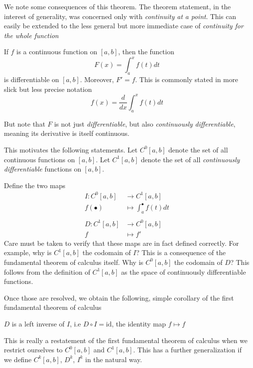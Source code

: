 \documentclass{article}
\begin{document}
We note some consequences of this theorem. The theorem statement, in the interest of generality, was concerned only with \emph{continuity at a point}. This can easily be extended to the less general but more immediate case of \emph{continuity for the whole function}

\begin{corollary}
    If $f$ is a continuous function on $[a, b]$, then the function
    \[
        F(x) = \int_a^x f(t)dt
    \]
    is differentiable on $[a, b]$. Moreover, $F' = f$. This is commonly stated in more slick but less precise notation
    \[
        f(x) = \frac{d}{dx}\int_a^x f(t)dt
    \]
\end{corollary}

But note that $F$ is not just \emph{differentiable}, but also \emph{continuously differentiable}, meaning its derivative is itself continuous.

This motivates the following statements. Let $C^0[a,b]$ denote the set of all continuous functions on $[a, b]$. Let $C^1[a,b]$ denote the set of all \emph{continuously differentiable} functions on $[a, b]$.

Define the two maps
\begin{align*}
    I: C^0[a,b] &\to C^1[a,b] \\
                f(\bullet) &\mapsto \int_a^\bullet f(t)dt \\
                \\
    D: C^1[a,b] &\to C^0[a,b] \\
                f &\mapsto f'
\end{align*}
Care must be taken to verify that these maps are in fact defined correctly. For example, why is $C^1[a,b]$ the codomain of $I$? This is a consequence of the fundamental theorem of calculus itself. Why is $C^0[a,b]$ the codomain of $D$? This follows from the definition of $C^1[a,b]$ as the space of continuously differentiable functions.

Once those are resolved, we obtain the following, simple corollary of the first fundamental theorem of calculus

\begin{corollary}
    $D$ is a left inverse of $I$, i.e $D \circ I = \text{id}$, the identity map $f \mapsto f$
\end{corollary}

This is really a restatement of the first fundamental theorem of calculus when we restrict ourselves to $C^0[a,b]$ and $C^1[a,b]$. This has a further generalization if we define $C^k[a,b]$, $D^k$, $I^k$ in the natural way.
\end{document}
